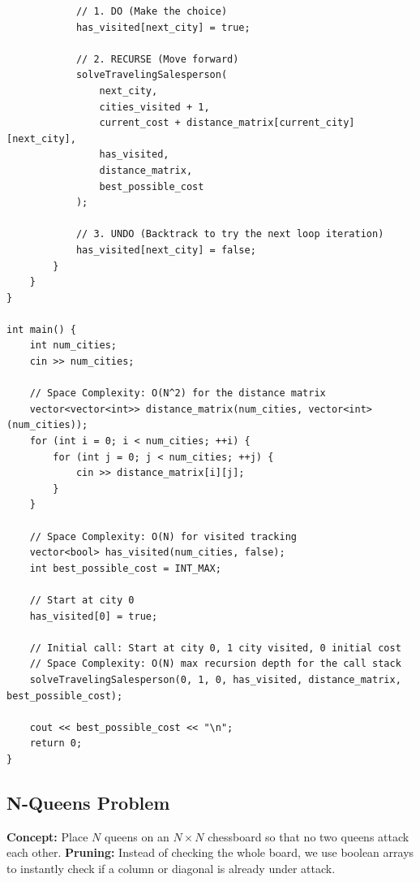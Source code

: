 \begin{lstlisting}
            // 1. DO (Make the choice)
            has_visited[next_city] = true;
            
            // 2. RECURSE (Move forward)
            solveTravelingSalesperson(
                next_city, 
                cities_visited + 1, 
                current_cost + distance_matrix[current_city][next_city], 
                has_visited, 
                distance_matrix, 
                best_possible_cost
            );
            
            // 3. UNDO (Backtrack to try the next loop iteration)
            has_visited[next_city] = false;
        }
    }
}

int main() {
    int num_cities;
    cin >> num_cities;
    
    // Space Complexity: O(N^2) for the distance matrix
    vector<vector<int>> distance_matrix(num_cities, vector<int>(num_cities));
    for (int i = 0; i < num_cities; ++i) {
        for (int j = 0; j < num_cities; ++j) {
            cin >> distance_matrix[i][j];
        }
    }
    
    // Space Complexity: O(N) for visited tracking
    vector<bool> has_visited(num_cities, false);
    int best_possible_cost = INT_MAX;
    
    // Start at city 0
    has_visited[0] = true;
    
    // Initial call: Start at city 0, 1 city visited, 0 initial cost
    // Space Complexity: O(N) max recursion depth for the call stack
    solveTravelingSalesperson(0, 1, 0, has_visited, distance_matrix, best_possible_cost);
    
    cout << best_possible_cost << "\n";
    return 0;
}
\end{lstlisting}

\subsection{N-Queens Problem}
\textbf{Concept:} Place $N$ queens on an $N \times N$ chessboard so that no two queens attack each other. 
\textbf{Pruning:} Instead of checking the whole board, we use boolean arrays to instantly check if a column or diagonal is already under attack.

